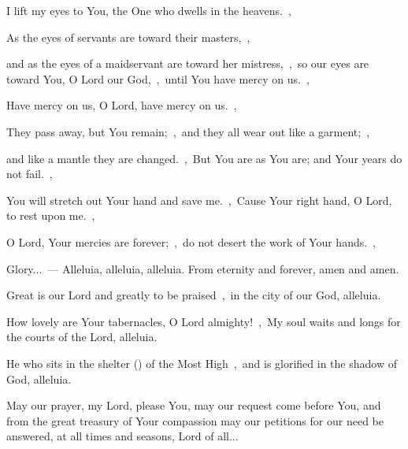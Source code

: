 \documentclass[12pt,twoside,a5paper]{article}
\begin{document}

\begin{halfparskip}
  I lift my eyes to You, the One who dwells in the heavens.~\sep

  As the eyes of servants are toward their masters,~\sep

  and as the eyes of a maidservant are toward her mistress,~\sep\ so our eyes are toward You, O Lord our God,~\sep\ until You have mercy on us.~\sep

  Have mercy on us, O Lord, have mercy on us.~\sep
\end{halfparskip}

\begin{halfparskip}
   They pass away, but You remain;~\sep\ and they all wear out like a garment;~\sep

  and like a mantle they are changed.~\sep\ But You are as You are; and Your years do not fail.~\sep
\end{halfparskip}

\begin{halfparskip}
   You will stretch out Your hand and save me.~\sep\ Cause Your right hand, O Lord, to rest upon me.~\sep

  O Lord, Your mercies are forever;~\sep\ do not desert the work of Your hands.~\sep
\end{halfparskip}

Glory...~--- Alleluia, alleluia, alleluia. From eternity and forever, amen and amen.


 Great is our Lord and greatly to be praised~\sep\ in the city of our God, alleluia.

 How lovely are Your tabernacles, O Lord almighty!~\sep\ My soul waits and longs for the courts of the Lord, alleluia.

 He who sits in the shelter () of the Most High~\sep\ and is glorified in the shadow of God, alleluia.


May our prayer, my Lord, please You, may our request come before You, and from the great treasury of Your compassion may our petitions for our need be answered, at all times and seasons, Lord of all...
\end{document}

